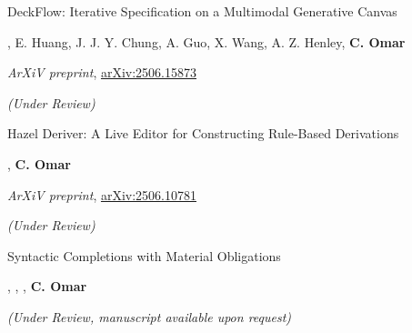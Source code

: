 \documentclass[10pt,letterpaper]{article}
\renewenvironment{itemize}{
  \begin{list}{}{
    \setlength{\leftmargin}{1.25em}
    \setlength{\itemsep}{0.25em}
    \setlength{\parskip}{0pt}
    \setlength{\parsep}{0.2em}
  }
}{
  \end{list}
}
\begin{document}
\begin{enumerate}[leftmargin=*, labelindent=6.5em, font=\bfseries]
  \item[ArXiV] {DeckFlow: Iterative Specification on a Multimodal Generative Canvas}
  \begin{itemize}
    \item {}, {E. Huang}, {J. J. Y. Chung}, A. Guo, X. Wang, A. Z. Henley, \textbf{C. Omar}
    \item \textit{ArXiV preprint}, \href{https://arxiv.org/abs/2506.15873}{arXiv:2506.15873}
    \item \textit{(Under Review)}
  \end{itemize}
  \item[ArXiV] {Hazel Deriver: A Live Editor for Constructing Rule-Based Derivations}
  \begin{itemize}
    \item {}, \textbf{C. Omar}
    \item \textit{ArXiV preprint}, \href{https://arxiv.org/abs/2506.10781}{arXiv:2506.10781}
    \item \textit{(Under Review)}
  \end{itemize}
  \item[-] {Syntactic Completions with Material Obligations}
  \begin{itemize}
    \item {}, , , \textbf{C. Omar}
    \item \textit{(Under Review, manuscript available upon request)}
  \end{itemize}
\end{enumerate}
\end{document}
